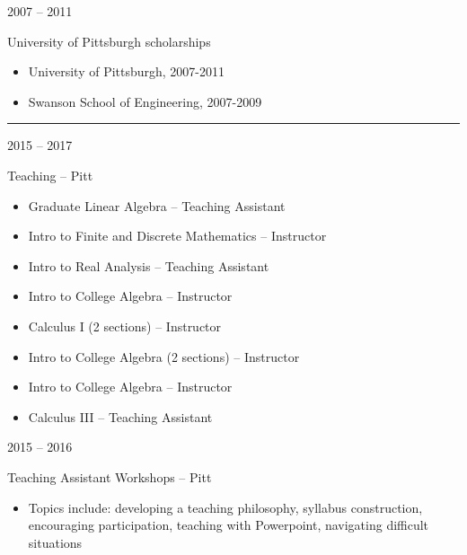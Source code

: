\documentclass[a4paper,10pt]{article}
\newlength{\cvcolumngapwidth}
\newlength{\cvleftcolumnwidth}
\newlength{\cvrightcolumnwidth}
\newcommand{\cvsectionstyle}[1]{{\normalsize\cvsectionfont\textcolor{cvsectioncolor}{#1}}}
\newcommand{\cvtitlestyle}[1]{{\large\cvtitlefont\textcolor{cvtitlecolor}{#1}}}
\newcommand{\cvheadingstyle}[1]{{\normalsize\cvheadingfont\textcolor{cvheadingcolor}{#1}}}
\newlength{\cvafteritemskipamount}
\newlength{\cvaftersectionskipamount}
\newlength{\cvbetweensectionandheadingextraskipamount}
\newlength{\cvaftertitleskipamount}
\newlength{\cvparskip}
\newcommand{\cvsection}[1]{
    \begin{minipage}[t]{\cvleftcolumnwidth}
        \raggedleft\cvsectionstyle{#1}
    \end{minipage}%
    \hspace{\cvcolumngapwidth}%
    \begin{minipage}[t]{\cvrightcolumnwidth}
        \textcolor{cvrulecolor}{\rule{\cvrightcolumnwidth}{0.3mm}}
    \end{minipage}

    \vspace{\cvaftersectionskipamount}
}
\newcommand{\cvitem}[2]{
    \begin{minipage}[t]{\cvleftcolumnwidth}
        \raggedleft #1
    \end{minipage}%
    \hspace{\cvcolumngapwidth}%
    \begin{minipage}[t]{\cvrightcolumnwidth}
        \setlength{\parskip}{\cvparskip} #2
    \end{minipage}

    \vspace{\cvafteritemskipamount}
}
\newcommand{\cvtitle}[1]{
    \cvtitlestyle{#1}

    \vspace{\cvaftertitleskipamount}
    \vspace{-\cvparskip}
}
\begin{document}
\cvitem{
    \cvheadingstyle{2007 -- 2011}
}{
        \cvtitle{University of Pittsburgh scholarships} 
        \begin{itemize}[leftmargin=*]
        \item University of Pittsburgh, 2007-2011
        \item Swanson School of Engineering, 2007-2009
        \end{itemize}
}


\cvsection{TEACHING EXPERIENCE}
\vspace{\cvbetweensectionandheadingextraskipamount}

\cvitem{
    \cvheadingstyle{2015 -- 2017}
}{
    \cvtitle{Teaching -- Pitt}
    \begin{itemize}[leftmargin=*]
        \item Graduate Linear Algebra -- Teaching Assistant
        	\item Intro to Finite and Discrete Mathematics -- Instructor
	\item Intro to Real Analysis -- Teaching Assistant
    	\item Intro to College Algebra -- Instructor
    	\item Calculus I (2 sections) -- Instructor
	\item Intro to College Algebra (2 sections) -- Instructor
	\item Intro to College Algebra -- Instructor
	\item Calculus III -- Teaching Assistant
    \end{itemize}

}

\cvitem{
    \cvheadingstyle{2015 -- 2016}
}{
    \cvtitle{Teaching Assistant Workshops -- Pitt}
    \begin{itemize}[leftmargin=*]
        \item Topics include: developing a teaching philosophy, syllabus construction, encouraging participation, teaching with Powerpoint, navigating difficult situations
    \end{itemize}
    
}

%
\end{document}
